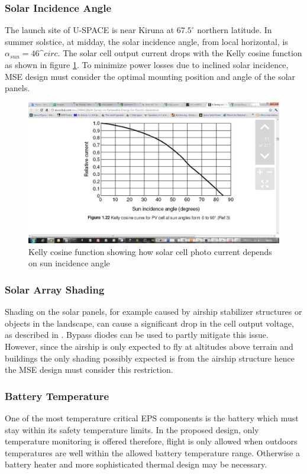\subsubsection*{Solar Incidence Angle}
The launch site of U-SPACE is near Kiruna at $67.5^{\circ}$ northern latitude. In summer solstice, at midday, the solar incidence angle, from local horizontal, is $\alpha_{sun}=46\^{circ}$\cite[eq. 1]{PDR}. The solar cell output current drops with the Kelly cosine function as shown in figure \ref{fig:KellyCosine}. To minimize power losses due to inclined solar incidence, \ac{MSE} design must consider the optimal mounting position and angle of the solar panels.
%
\begin{figure}[H]
\centering
\includegraphics[scale=0.4]{figures/fig_KellyCosine}
\caption{Kelly cosine function showing how solar cell photo current depends on sun incidence angle}
\label{fig:KellyCosine}
\end{figure}
%
\subsubsection*{Solar Array Shading}
Shading on the solar panels, for example caused by airship stabilizer structures or objects in the landscape, can cause a significant drop in the cell output voltage, as described in \cite[p. 165]{Mukund}. Bypass diodes can be used to partly mitigate this issue. However, since the airship is only expected to fly at altitudes above terrain and buildings the only shading possibly expected is from the airship structure hence the \ac{MSE} design must consider this restriction.
%
\subsubsection*{Battery Temperature}
One of the most temperature critical \ac{EPS} components is the battery which must stay within its safety temperature limits. In the proposed design, only temperature monitoring is offered therefore, flight is only allowed when outdoors temperatures are well within the allowed battery temperature range. Otherwise a battery heater and more sophisticated thermal design may be necessary.
%
